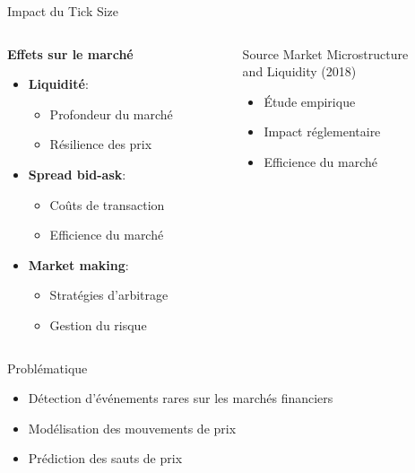 \documentclass[aspectratio=169]{beamer}  %
\begin{document}
\begin{frame}{Impact du Tick Size}
    \begin{columns}
        \begin{column}{0.6\textwidth}
            \textbf{Effets sur le marché}
            \begin{itemize}
                \item \textbf{Liquidité}:
                \begin{itemize}
                    \item Profondeur du marché
                    \item Résilience des prix
                \end{itemize}
                \item \textbf{Spread bid-ask}:
                \begin{itemize}
                    \item Coûts de transaction
                    \item Efficience du marché
                \end{itemize}
                \item \textbf{Market making}:
                \begin{itemize}
                    \item Stratégies d'arbitrage
                    \item Gestion du risque
                \end{itemize}
            \end{itemize}
        \end{column}
        \begin{column}{0.4\textwidth}
            \begin{alertblock}{Source}
                \small{Market Microstructure\\and Liquidity (2018)}
                \begin{itemize}
                    \item Étude empirique
                    \item Impact réglementaire
                    \item Efficience du marché
                \end{itemize}
            \end{alertblock}
        \end{column}
    \end{columns}
\end{frame}

\begin{frame}{Problématique}
    \begin{itemize}
        \item Détection d'événements rares sur les marchés financiers
        \item Modélisation des mouvements de prix
        \item Prédiction des sauts de prix
    \end{itemize}
\end{frame}
\end{document}
